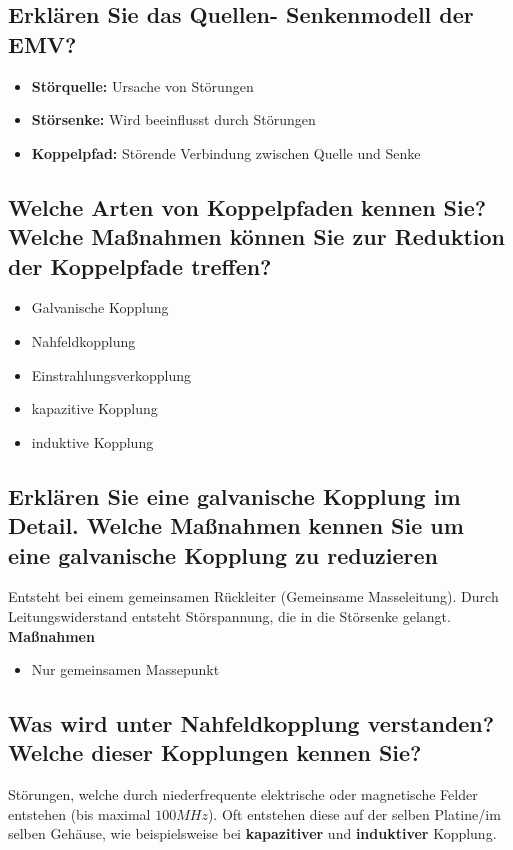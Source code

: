 \subsection{Erklären Sie das Quellen- Senkenmodell der EMV?}
\begin{itemize}
  \item \textbf{Störquelle:} Ursache von Störungen
  \item \textbf{Störsenke:} Wird beeinflusst durch Störungen
  \item \textbf{Koppelpfad:} Störende Verbindung zwischen Quelle und Senke
\end{itemize}

\subsection{Welche Arten von Koppelpfaden kennen Sie? Welche Maßnahmen können Sie zur Reduktion der Koppelpfade treffen?}
\begin{itemize}
  \item Galvanische Kopplung
  \item Nahfeldkopplung
  \item Einstrahlungsverkopplung
  \item kapazitive Kopplung
  \item induktive Kopplung
\end{itemize}

\subsection{Erklären Sie eine galvanische Kopplung im Detail. Welche Maßnahmen kennen Sie um eine galvanische Kopplung zu reduzieren}
Entsteht bei einem gemeinsamen Rückleiter (Gemeinsame Masseleitung). Durch Leitungswiderstand entsteht Störspannung, die in die Störsenke gelangt.\p
\textbf{Maßnahmen}
\begin{itemize}
  \item Nur gemeinsamen Massepunkt
\end{itemize}


\subsection{Was wird unter Nahfeldkopplung verstanden? Welche dieser Kopplungen kennen Sie?}
Störungen, welche durch niederfrequente elektrische oder magnetische Felder entstehen (bis maximal \(100MHz\)). Oft entstehen diese auf der selben Platine/im selben Gehäuse, wie beispielsweise bei \textbf{kapazitiver} und \textbf{induktiver} Kopplung.


